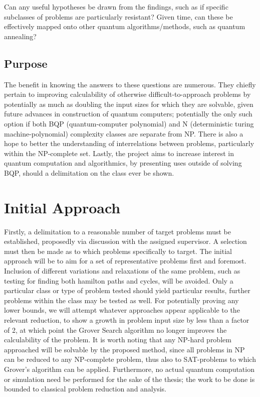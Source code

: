 \documentclass[msc,lith,english]{liuthesis}
\begin{document}
Can any useful hypotheses be drawn from the findings, such as if specific subclasses of problems are particularly resistant? Given time, can these be effectively mapped onto other quantum algorithms/methods, such as quantum annealing?

\subsection{Purpose}
The benefit in knowing the answers to these questions are numerous. They chiefly pertain to improving calculability of otherwise difficult-to-approach problems by potentially as much as doubling the input sizes for which they are solvable, given future advances in construction of quantum computers; potentially the only such option if both BQP (quantum-computer polynomial) and N (deterministic turing machine-polynomial) complexity classes are separate from NP. There is also a hope to better the understanding of interrelations between problems, particularly within the NP-complete set. Lastly, the project aims to increase interest in quantum computation and algorithmics, by presenting uses outside of solving BQP, should a delimitation on the class ever be shown.

\section{Initial Approach}
Firstly, a delimitation to a reasonable number of target problems must be established, proposedly via discussion with the assigned supervisor. A selection must then be made as to which problems specifically to target. The initial approach will be to aim for a set of representative problems first and foremost. Inclusion of different variations and relaxations of the same problem, such as testing for finding both hamilton paths and cycles, will be avoided. Only a particular class or type of problem tested should yield particular results, further problems within the class may be tested as well. For potentially proving any lower bounds, we will attempt whatever approaches appear applicable to the relevant reduction, to show a growth in problem input size by less than a factor of 2, at which point the Grover Search algorithm no longer improves the calculability of the problem. It is worth noting that any NP-hard problem approached will be solvable by the proposed method, since all problems in NP can be reduced to any NP-complete problem, thus also to SAT-problems to which Grover’s algorithm can be applied. Furthermore, no actual quantum computation or simulation need be performed for the sake of the thesis; the work to be done is bounded to classical problem reduction and analysis.
\end{document}
